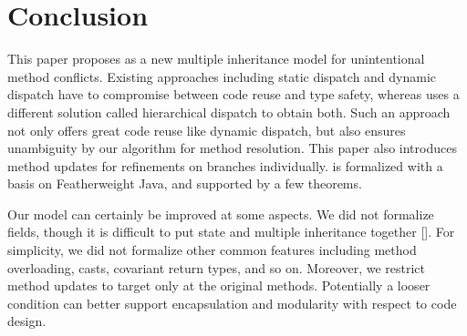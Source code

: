 \section{Conclusion}

This paper proposes \MIM{} as a new multiple inheritance model for unintentional method conflicts.
Existing approaches including static dispatch and dynamic dispatch have to compromise between code reuse
and type safety, whereas \MIM{} uses a different solution called hierarchical dispatch to obtain both.
Such an approach not only offers great code reuse like dynamic dispatch, but also ensures unambiguity by
our algorithm for method resolution. This paper also introduces method updates for refinements on branches individually.
\MIM{} is formalized with a basis on Featherweight Java, and supported
by a few theorems.

Our model can certainly be improved at some aspects. We did not formalize fields, though it is difficult to
put state and multiple inheritance together []. For simplicity, we did not formalize other common features including
method overloading, casts, covariant return types, and so on. Moreover, we restrict method updates to target only at the
original methods. Potentially a looser condition can better support encapsulation and modularity with respect to code design.